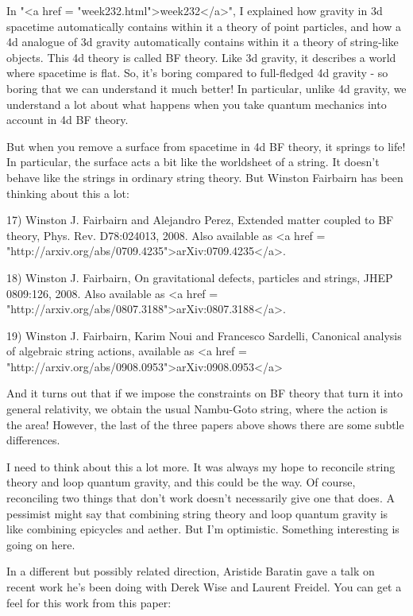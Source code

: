 In "<a href = "week232.html">week232</a>", I explained how
gravity in 3d spacetime automatically contains within it a theory of
point particles, and how a 4d analogue of 3d gravity automatically
contains within it a theory of string-like objects.  This 4d theory is
called BF theory.  Like 3d gravity, it describes a world where
spacetime is flat.  So, it's boring compared to full-fledged 4d
gravity - so boring that we can understand it much better!  In
particular, unlike 4d gravity, we understand a lot about what happens
when you take quantum mechanics into account in 4d BF theory.

But when you remove a surface from spacetime in 4d BF 
theory, it springs to life!  In particular, the surface acts 
a bit like the worldsheet of a string.  It doesn't behave like the 
strings in ordinary string theory.  But Winston Fairbairn has
been thinking about this a lot:

17) Winston J. Fairbairn and Alejandro Perez, Extended matter coupled 
to BF theory, Phys. Rev. D78:024013, 2008.  Also available as 
<a href = "http://arxiv.org/abs/0709.4235">arXiv:0709.4235</a>.

18) Winston J. Fairbairn, On gravitational defects, particles and 
strings, JHEP 0809:126, 2008.  Also available as <a href = 
"http://arxiv.org/abs/0807.3188">arXiv:0807.3188</a>.

19) Winston J. Fairbairn, Karim Noui and Francesco Sardelli, Canonical 
analysis of algebraic string actions, available as <a href = 
"http://arxiv.org/abs/0908.0953">arXiv:0908.0953</a>

And it turns out that if we impose the constraints on BF theory that
turn it into general relativity, we obtain the usual Nambu-Goto
string, where the action is the area!  However, the last of the three
papers above shows there are some subtle differences.

I need to think about this a lot more.  It was always my hope to
reconcile string theory and loop quantum gravity, and this could be
the way.  Of course, reconciling two things that don't work doesn't
necessarily give one that does.  A pessimist might say that 
combining string theory and loop quantum gravity is like combining epicycles
and aether.  But I'm optimistic.  Something interesting is going on here.

In a different but possibly related direction, Aristide Baratin gave
a talk on recent work he's been doing with Derek Wise and Laurent
Freidel.  You can get a feel for this work from this paper:

